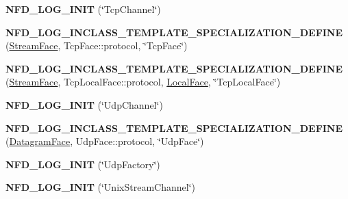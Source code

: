 \begin{DoxyCompactItemize}
\item 
{\bfseries N\+F\+D\+\_\+\+L\+O\+G\+\_\+\+I\+N\+IT} (\char`\"{}Tcp\+Channel\char`\"{})\hypertarget{namespacenfd_a2a3baa25e6c02691a832f41dbccda050}{}\label{namespacenfd_a2a3baa25e6c02691a832f41dbccda050}

\item 
{\bfseries N\+F\+D\+\_\+\+L\+O\+G\+\_\+\+I\+N\+C\+L\+A\+S\+S\+\_\+\+T\+E\+M\+P\+L\+A\+T\+E\+\_\+\+S\+P\+E\+C\+I\+A\+L\+I\+Z\+A\+T\+I\+O\+N\+\_\+\+D\+E\+F\+I\+NE} (\hyperlink{classnfd_1_1StreamFace}{Stream\+Face}, Tcp\+Face\+::protocol, \char`\"{}Tcp\+Face\char`\"{})\hypertarget{namespacenfd_ae7e2195a1517f910fda0fb1bf46e2be0}{}\label{namespacenfd_ae7e2195a1517f910fda0fb1bf46e2be0}

\item 
{\bfseries N\+F\+D\+\_\+\+L\+O\+G\+\_\+\+I\+N\+C\+L\+A\+S\+S\+\_\+T\+E\+M\+P\+L\+A\+T\+E\+\_\+\+S\+P\+E\+C\+I\+A\+L\+I\+Z\+A\+T\+I\+O\+N\+\_\+\+D\+E\+F\+I\+NE} (\hyperlink{classnfd_1_1StreamFace}{Stream\+Face}, Tcp\+Local\+Face\+::protocol, \hyperlink{classnfd_1_1LocalFace}{Local\+Face}, \char`\"{}Tcp\+Local\+Face\char`\"{})\hypertarget{namespacenfd_a9897925e1d9c1ae4cb645d7e59875f3b}{}\label{namespacenfd_a9897925e1d9c1ae4cb645d7e59875f3b}

\item 
{\bfseries N\+F\+D\+\_\+\+L\+O\+G\+\_\+\+I\+N\+IT} (\char`\"{}Udp\+Channel\char`\"{})\hypertarget{namespacenfd_a2fa2fabc92c9bd1d8dcca89f04d59f24}{}\label{namespacenfd_a2fa2fabc92c9bd1d8dcca89f04d59f24}

\item 
{\bfseries N\+F\+D\+\_\+\+L\+O\+G\+\_\+\+I\+N\+C\+L\+A\+S\+S\+\_\+\+T\+E\+M\+P\+L\+A\+T\+E\+\_\+\+S\+P\+E\+C\+I\+A\+L\+I\+Z\+A\+T\+I\+O\+N\+\_\+\+D\+E\+F\+I\+NE} (\hyperlink{classnfd_1_1DatagramFace}{Datagram\+Face}, Udp\+Face\+::protocol, \char`\"{}Udp\+Face\char`\"{})\hypertarget{namespacenfd_aae414ca2c653ca74d8bf5f3cd3dd462d}{}\label{namespacenfd_aae414ca2c653ca74d8bf5f3cd3dd462d}

\item 
{\bfseries N\+F\+D\+\_\+\+L\+O\+G\+\_\+\+I\+N\+IT} (\char`\"{}Udp\+Factory\char`\"{})\hypertarget{namespacenfd_ab06c256c8e12a5fb6a003c237a6b8862}{}\label{namespacenfd_ab06c256c8e12a5fb6a003c237a6b8862}

\item 
{\bfseries N\+F\+D\+\_\+\+L\+O\+G\+\_\+\+I\+N\+IT} (\char`\"{}Unix\+Stream\+Channel\char`\"{})\hypertarget{namespacenfd_ac36604591c66d07cc9c8176f048e3e60}{}\label{namespacenfd_ac36604591c66d07cc9c8176f048e3e60}


\end{DoxyCompactItemize}
